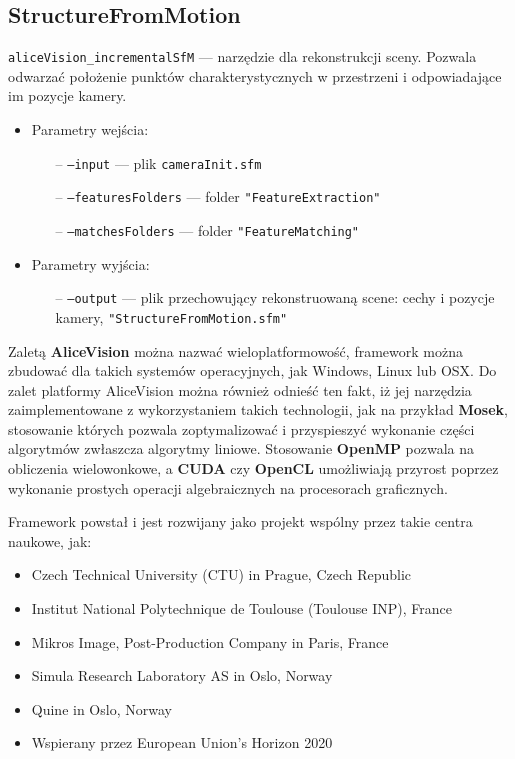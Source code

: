 \subsection{StructureFromMotion}

\texttt{aliceVision\_incrementalSfM} --- narzędzie dla rekonstrukcji sceny. Pozwala odwarzać położenie punktów charakterystycznych w przestrzeni i odpowiadające im pozycje kamery.

\begin{itemize}
   \item Parametry wejścia:
   \begin{itemize}
      \item[--] \texttt{--input} --- plik \texttt{cameraInit.sfm}
      \item[--] \texttt{--featuresFolders} --- folder \texttt{"FeatureExtraction"}
      \item[--] \texttt{--matchesFolders} --- folder \texttt{"FeatureMatching"}
   \end{itemize}

   \item Parametry wyjścia:
   \begin{itemize}
      \item[--] \texttt{--output} --- plik przechowujący rekonstruowaną scene: cechy i pozycje kamery,  \texttt{"StructureFromMotion.sfm"}
   \end{itemize}
\end{itemize}


Zaletą \textbf{AliceVision} można nazwać wieloplatformowość, framework można zbudować dla takich systemów operacyjnych, jak Windows, Linux lub OSX.
Do zalet platformy AliceVision można również odnieść ten fakt, iż jej narzędzia zaimplementowane z wykorzystaniem takich technologii, jak na przykład \textbf{Mosek}, stosowanie których pozwala zoptymalizować i przyspieszyć wykonanie części algorytmów zwłaszcza algorytmy liniowe.
Stosowanie \textbf{OpenMP} pozwala na obliczenia wielowonkowe, a \textbf{CUDA} czy \textbf{OpenCL} umożliwiają przyrost poprzez wykonanie prostych operacji algebraicznych na procesorach graficznych.

Framework powstał i jest rozwijany jako projekt wspólny przez takie centra naukowe, jak:
\begin{itemize}
   \item Czech Technical University (CTU) in Prague, Czech Republic
   \item Institut National Polytechnique de Toulouse (Toulouse INP), France
   \item Mikros Image, Post-Production Company in Paris, France
   \item Simula Research Laboratory AS in Oslo, Norway
   \item Quine in Oslo, Norway
   \item Wspierany przez European Union’s Horizon 2020
\end{itemize}

